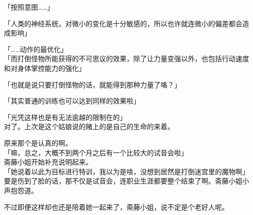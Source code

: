 「按照意图……」

「人类的神经系统，对微小的变化是十分敏感的，所以也许就连微小的偏差都会造成影响」

「……动作的最优化」\\

「而打倒怪物所能获得的不可思议的效果，除了让力量变强以外，也包括行动速度和对身体掌控能力的强化」

「也就是说只要打倒怪物的话，就能得到那种力量了咯？」

「其实普通的训练也可以达到同样的效果啦」

「光凭这样也是有无法逾越的限制在的」\\

对了。上次是这个姑娘说的赌上的是自己的生命的来着。

原来那个是认真的啊。\\

「嘛，总之，大概不到两个月之后有一个比较大的试音会啦」\\

斋藤小姐开始补充说明起来。\\

「她说着以此为目标进行特训，我以为是啥，没想到居然是打倒迷宫里的魔物啊」\\

要是伤到了脸的话，那不仅是试音会，连职业生涯都要整个结束了啊。斋藤小姐小声抱怨道。

不过即便这样却也还是陪着她一起来了，斋藤小姐，说不定是个老好人呢。\\

